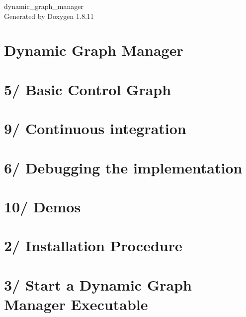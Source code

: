 \documentclass[twoside]{book}
\newcommand{\+}{\discretionary{\mbox{\scriptsize$\hookleftarrow$}}{}{}}
\newcommand{\clearemptydoublepage}{%
  \newpage{\pagestyle{empty}\cleardoublepage}%
}
\begin{document}
\hypersetup{pageanchor=false,
             bookmarksnumbered=true,
             pdfencoding=unicode
            }
\begin{titlepage}
\vspace*{7cm}
\begin{center}%
{\Large dynamic\+\_\+graph\+\_\+manager }\\
\vspace*{1cm}
{\large Generated by Doxygen 1.8.11}\\
\end{center}
\end{titlepage}
\clearemptydoublepage
\tableofcontents
\clearemptydoublepage
{}
\hypersetup{pageanchor=true}

\chapter{Dynamic Graph Manager}
\label{index}\hypertarget{index}{}
\chapter{5/ Basic Control Graph}
\label{subpage_basic_control_graph}
\hypertarget{subpage_basic_control_graph}{}

\chapter{9/ Continuous integration}
\label{subpage_ci}
\hypertarget{subpage_ci}{}

\chapter{6/ Debugging the implementation}
\label{subpage_debugging}
\hypertarget{subpage_debugging}{}

\chapter{10/ Demos}
\label{subpage_demos}
\hypertarget{subpage_demos}{}

\chapter{2/ Installation Procedure}
\label{subpage_installation}
\hypertarget{subpage_installation}{}

\chapter{3/ Start a Dynamic Graph Manager Executable}
\label{subpage_launch}
\hypertarget{subpage_launch}{}

\end{document}

